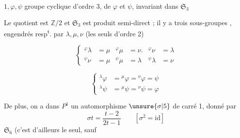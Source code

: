 $1,\varphi,\psi$ groupe cyclique d'ordre 3, de  $\varphi$ et $\psi$, invariant dans $\mathfrak{S}_3$

Le quotient est $\mathbb{Z}/2$ et $\mathfrak{S}_3$ est produit semi-direct ; il y a trois sous-groupes , engendrés resp\textsuperscript{t}. par $\lambda,\mu,\nu$ (les seuls  d'ordre 2)

\begingroup\makeatletter\tagsleft@true\makeatother
\[
\left\{\begin{aligned}
{}^\varphi\lambda&=\mu&{}^\varphi\mu&=\nu.&{}^\varphi\nu&=\lambda\\
{}^\psi\nu&=\mu&{}^\psi\mu&=\lambda&{}^{\psi}\lambda&=\nu
\end{aligned}\right.\tag*{4)}
\]
\endgroup

\begingroup\makeatletter\tagsleft@true\makeatother
\[
\left\{\begin{aligned}
{}^\lambda\varphi&={}^\mu\varphi={}^\nu\varphi=\psi\\
{}^\lambda\psi&={}^\mu\psi={}^\nu\psi=\varphi
\end{aligned}\right.\tag*{5)}
\]
\endgroup

De plus, on a dans $P^1$ un automorphisme $\unsure{\sigma|5}$  de carré 1, donné par
\begingroup\makeatletter\tagsleft@true\makeatother
\[
\sigma t=\frac{t-2}{2t-1}\qquad[\sigma^2=\mathrm{id}]\tag*{6)}
\]
\endgroup
{} $\mathfrak{S}_{6}$ (c'est d'ailleurs le seul, sauf

